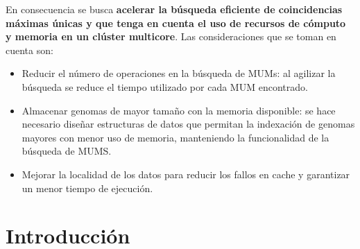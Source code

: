 \documentclass[12pt,a4paper]{article}
\begin{document}
En consecuencia se busca \textbf{acelerar la búsqueda eficiente de 
coincidencias máximas únicas y que tenga en cuenta el uso de recursos de cómputo y
memoria en un clúster multicore}. Las consideraciones que se toman en cuenta son:
\begin{itemize}
\item Reducir el número de operaciones en la búsqueda de MUMs: al agilizar la búsqueda se reduce el tiempo utilizado por cada MUM encontrado.
\item Almacenar genomas de mayor tamaño con la memoria disponible: se hace necesario diseñar estructuras de datos que permitan la indexación de genomas mayores con menor uso de memoria, manteniendo la funcionalidad de la búsqueda de MUMS.
\item Mejorar la localidad de los datos para reducir los fallos en cache y garantizar un menor tiempo de ejecución.\end{itemize}
\section{Introducción} 
\end{document}
